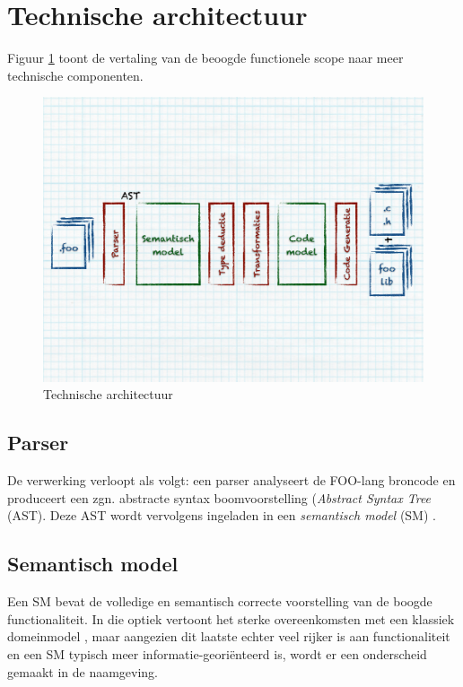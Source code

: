 \section{Technische architectuur}
\label{section:arch-technical}

Figuur \ref{fig:arch-technical} toont de vertaling van de beoogde functionele
scope naar meer technische componenten. 

\begin{figure}[ht]
  \centering
  \includegraphics[width=0.9\linewidth]{resources/arch-technical.pdf}
  \caption{Technische architectuur}
  \label{fig:arch-technical}
\end{figure}

\subsection{Parser}

De verwerking verloopt als volgt: een parser analyseert de FOO-lang broncode en
produceert een zgn. abstracte syntax boomvoorstelling (\emph{Abstract Syntax
Tree} (AST). Deze AST wordt vervolgens ingeladen in een \emph{semantisch model}
(SM) \citep{fowler2010domain}.

\subsection{Semantisch model}
\label{subsection:arch-semantic-model}

Een SM bevat de volledige en semantisch correcte voorstelling van de boogde
functionaliteit. In die optiek vertoont het sterke overeenkomsten met een
klassiek domeinmodel \citep{fowler2010domain}, maar aangezien dit laatste
echter veel rijker is aan functionaliteit en een SM typisch meer
informatie-geori\"enteerd is, wordt er een onderscheid gemaakt in de naamgeving.

